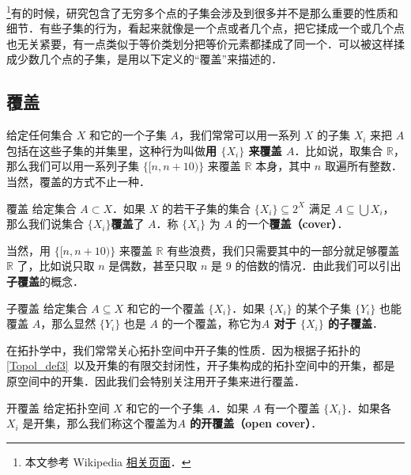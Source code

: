 


\footnote{本文参考 Wikipedia \href{https://en.wikipedia.org/wiki/Sequentially_compact_space}{相关页面}．}有的时候，研究包含了无穷多个点的子集会涉及到很多并不是那么重要的性质和细节．有些子集的行为，看起来就像是一个点或者几个点，把它揉成一个或几个点也无关紧要，有一点类似于等价类划分把等价元素都揉成了同一个．可以被这样揉成少数几个点的子集，是用以下定义的“覆盖”来描述的．

\subsection{覆盖}

给定任何集合 $X$ 和它的一个子集 $A$，我们常常可以用一系列 $X$ 的子集 $X_i$ 来把 $A$ 包括在这些子集的并集里，这种行为叫做\textbf{用 $\{X_i\}$ 来覆盖 $A$}．比如说，取集合 $\mathbb{R}$，那么我们可以用一系列子集 $\{[n, n+10)\}$ 来覆盖 $\mathbb{R}$ 本身，其中 $n$ 取遍所有整数．当然，覆盖的方式不止一种．

\begin{definition}{覆盖}
给定集合 $A\subset X$．如果 $X$ 的若干子集的集合 $\{X_i\}\subseteq 2^X$ 满足 $A\subseteq\bigcup X_i$，那么我们说集合 $\{X_i\}$\textbf{覆盖}了 $A$．称 $\{X_i\}$ 为 $A$ 的一个\textbf{覆盖（cover）}．
\end{definition}

当然，用 $\{[n, n+10)\}$ 来覆盖 $\mathbb{R}$ 有些浪费，我们只需要其中的一部分就足够覆盖 $\mathbb{R}$ 了，比如说只取 $n$ 是偶数，甚至只取 $n$ 是 $9$ 的倍数的情况．由此我们可以引出\textbf{子覆盖}的概念．

\begin{definition}{子覆盖}
给定集合 $A\subseteq X$ 和它的一个覆盖 $\{X_i\}$．如果 $\{X_i\}$ 的某个子集 $\{Y_i\}$ 也能覆盖 $A$，那么显然 $\{Y_i\}$ 也是 $A$ 的一个覆盖，称它为\textbf{$A$ 对于 $\{X_i\}$ 的子覆盖}．
\end{definition}

在拓扑学中，我们常常关心拓扑空间中开子集的性质．因为根据子拓扑的\autoref{Topol_def3}~以及开集的有限交封闭性，开子集构成的拓扑空间中的开集，都是原空间中的开集．因此我们会特别关注用开子集来进行覆盖．

\begin{definition}{开覆盖}
给定拓扑空间 $X$ 和它的一个子集 $A$．如果 $A$ 有一个覆盖 $\{X_i\}$．如果各 $X_i$ 是开集，那么我们称这个覆盖为\textbf{$A$ 的开覆盖（open cover）}．
\end{definition}

